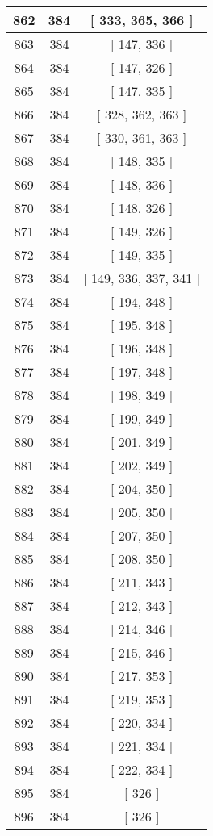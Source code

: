 \begin{center}
\begin{longtable}[H]{|| c c c ||}
\\\hline
862 & 384 & [ 333, 365, 366 ]
\\\hline
863 & 384 & [ 147, 336 ]
\\\hline
864 & 384 & [ 147, 326 ]
\\\hline
865 & 384 & [ 147, 335 ]
\\\hline
866 & 384 & [ 328, 362, 363 ]
\\\hline
867 & 384 & [ 330, 361, 363 ]
\\\hline
868 & 384 & [ 148, 335 ]
\\\hline
869 & 384 & [ 148, 336 ]
\\\hline
870 & 384 & [ 148, 326 ]
\\\hline
871 & 384 & [ 149, 326 ]
\\\hline
872 & 384 & [ 149, 335 ]
\\\hline
873 & 384 & [ 149, 336, 337, 341 ]
\\\hline
874 & 384 & [ 194, 348 ]
\\\hline
875 & 384 & [ 195, 348 ]
\\\hline
876 & 384 & [ 196, 348 ]
\\\hline
877 & 384 & [ 197, 348 ]
\\\hline
878 & 384 & [ 198, 349 ]
\\\hline
879 & 384 & [ 199, 349 ]
\\\hline
880 & 384 & [ 201, 349 ]
\\\hline
881 & 384 & [ 202, 349 ]
\\\hline
882 & 384 & [ 204, 350 ]
\\\hline
883 & 384 & [ 205, 350 ]
\\\hline
884 & 384 & [ 207, 350 ]
\\\hline
885 & 384 & [ 208, 350 ]
\\\hline
886 & 384 & [ 211, 343 ]
\\\hline
887 & 384 & [ 212, 343 ]
\\\hline
888 & 384 & [ 214, 346 ]
\\\hline
889 & 384 & [ 215, 346 ]
\\\hline
890 & 384 & [ 217, 353 ]
\\\hline
891 & 384 & [ 219, 353 ]
\\\hline
892 & 384 & [ 220, 334 ]
\\\hline
893 & 384 & [ 221, 334 ]
\\\hline
894 & 384 & [ 222, 334 ]
\\\hline
895 & 384 & [ 326 ]
\\\hline
896 & 384 & [ 326 ]

\end{longtable}
\end{center}
